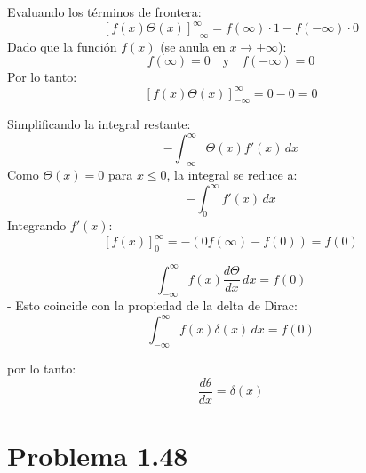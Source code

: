 \documentclass[12pt]{article}
\begin{document}
\begin{enumerate}[(a)]
Evaluando los  términos de frontera:
   \[
   \left[ f(x) \Theta(x) \right]_{-\infty}^{\infty} = f(\infty) \cdot 1 - f(-\infty) \cdot 0
   \]
    Dado que la función \( f(x) \)  (se anula en \( x \to \pm\infty \)):
   \[
   f(\infty) = 0 \quad \text{y} \quad f(-\infty) = 0
   \]
   Por lo tanto:
   \[
   \left[ f(x) \Theta(x) \right]_{-\infty}^{\infty} = 0 - 0 = 0
   \]

Simplificando  la integral restante:
   \[
    -\int_{-\infty}^{\infty} \Theta(x) f'(x) \, dx 
   \]
    Como \( \Theta(x) = 0 \) para \( x \leq 0 \), la integral se reduce a:
   \[
   - \int_{0}^{\infty} f'(x) \, dx 
   \]
    Integrando \( f'(x) \):
   \[
   \left[ f(x) \right]_{0}^{\infty} = - \left( 0{f(\infty)} - f(0) \right) = f(0)
   \]

   \[
   \int_{-\infty}^{\infty} f(x) \frac{d\Theta}{dx} \, dx = f(0)
   \]
   - Esto coincide con la propiedad de la delta de Dirac:
   \[
   \int_{-\infty}^{\infty} f(x) \delta(x) \, dx = f(0)
   \]

por lo tanto:
\[\boxed{\frac{d\theta}{dx} =\delta(x)}\]

\end{enumerate}
\section*{\color{blue} Problema 1.48}
\end{document}
